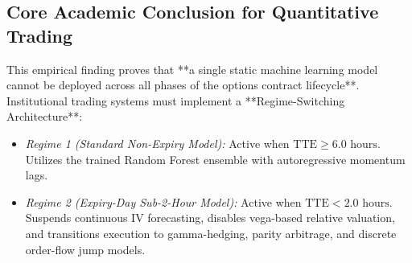 \subsection{Core Academic Conclusion for Quantitative Trading}
This empirical finding proves that **a single static machine learning model cannot be deployed across all phases of the options contract lifecycle**. Institutional trading systems must implement a **Regime-Switching Architecture**:
\begin{itemize}
    \item \textit{Regime 1 (Standard Non-Expiry Model):} Active when $\text{TTE} \ge 6.0\text{ hours}$. Utilizes the trained Random Forest ensemble with autoregressive momentum lags.
    \item \textit{Regime 2 (Expiry-Day Sub-2-Hour Model):} Active when $\text{TTE} < 2.0\text{ hours}$. Suspends continuous IV forecasting, disables vega-based relative valuation, and transitions execution to gamma-hedging, parity arbitrage, and discrete order-flow jump models.
\end{itemize}
